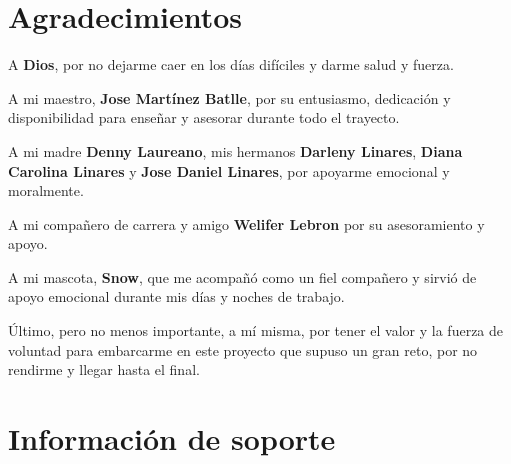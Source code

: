 \documentclass[11pt,]{article}
\begin{document}
\section{Agradecimientos}\label{agradecimientos}

A \textbf{Dios}, por no dejarme caer en los días difíciles y darme salud
y fuerza.

A mi maestro, \textbf{Jose Martínez Batlle}, por su entusiasmo,
dedicación y disponibilidad para enseñar y asesorar durante todo el
trayecto.

A mi madre \textbf{Denny Laureano}, mis hermanos \textbf{Darleny
Linares}, \textbf{Diana Carolina Linares} y \textbf{Jose Daniel
Linares}, por apoyarme emocional y moralmente.

A mi compañero de carrera y amigo \textbf{Welifer Lebron} por su
asesoramiento y apoyo.

A mi mascota, \textbf{Snow}, que me acompañó como un fiel compañero y
sirvió de apoyo emocional durante mis días y noches de trabajo.

Último, pero no menos importante, a mí misma, por tener el valor y la
fuerza de voluntad para embarcarme en este proyecto que supuso un gran
reto, por no rendirme y llegar hasta el final.

\section{Información de soporte}\label{informaciuxf3n-de-soporte}
\end{document}
